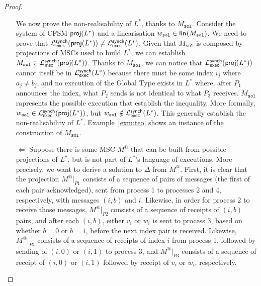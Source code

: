 \begin{proof}
\begin{itemize}
			We now prove the non-realisability of $L^*$, thanks to $M_{\texttt{sol}}$.
			Consider the system of CFSM $\mathsf{proj}(L^*)$ and a 
			linearisation $w_{\texttt{sol}}\in \mathsf{lin}_{}(M_{\texttt{sol}})$. 
			We need to prove that 	
			$\mathcal{L}_{\mathsf{exec}}^{\mathsf{synch}}(\mathsf{proj}(L^*))\neq\mathcal{L}_{\mathsf{exec}}^{\mathsf{synch}}(L^*)$.
			Given that $M_{\texttt{sol}}$ is composed by projections of MSCs 
			used to build $L^*$, we can establish 
			$M_{\texttt{sol}}\in\mathcal{L}_{\mathsf{msc}}^{\mathsf{synch}}(\mathsf{proj}(L^*))$.
			Thanks to $M_{\texttt{sol}}$, we can notice that 
			$\mathcal{L}_{\mathsf{exec}}^{\mathsf{synch}}(\mathsf{proj}(L^*))$ cannot 
			itself be in $\mathcal{L}_{\mathsf{exec}}^{\mathsf{synch}}(L^*)$ because there must be
			some index $i_j$ where $a_j \neq b_j$, and no execution of the Global 
			Type exists in $L^*$ where,
			after $P_1$ announces the index, what $P_2$ sends is not
			identical to what $P_3$ receives.
			$M_{\texttt{sol}}$ rapresents the possible execution 
			that establish the inequality. More formally, 
			$w_{\texttt{sol}} \in \mathcal{L}_{\mathsf{exec}}^{\mathsf{synch}}(\mathsf{proj}(L^*))$,
			but $w_{\texttt{sol}} \notin \mathcal{L}_{\mathsf{exec}}^{\mathsf{synch}}(L^*)$. 
			This generally establish the
			non-realisability of $L^*$. Example~\ref{exm:teo} shows an instance
			of the construction of $M_{\texttt{sol}}$.

		\item[$\Leftarrow$]
			Suppose there is some MSC $M^@$ that can be built from possible 
			projections of $L^*$, but is not part of $L^*$'s language
			of executions. 
			More precisely, we want to derive a solution to $\Delta$ from $M^@$.
			First, it is clear that the projection $M^@|_{P1}$ consists of a sequence
			of pairs of messages (the first of each pair acknowledged), sent from
			process 1 to processes 2 and 4, respectively, with messages $(i, b)$ and $i$.
			Likewise, in order for process 2 to receive those messages,
			$M^@|_{P2}$ consists of a sequence of receipts of $(i, b)$ pairs, and after
			each $(i, b)$, either $v_i$ or $w_i$ is sent to process 3, based on whether
			$b = 0$ or $b = 1$, before the next index pair is received.
			Likewise, $M^@|_{P4}$ consists of a sequence of receipts of index $i$ from
			process 1, followed by sending of $(i, 0)$ or $(i, 1)$ to process 3, and
			$M^@|_{P3}$ consists of a sequence of receipt of $(i, 0)$ or $(i, 1)$ followed
			by receipt of $v_i$ or $w_i$, respectively.


\end{itemize}
\end{proof}
